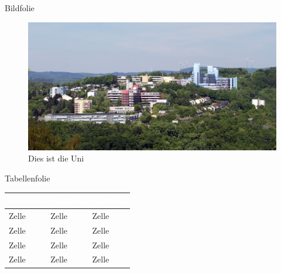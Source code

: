 \documentclass[aspectratio=169, table]{beamer}
\begin{document}
\begin{frame}{Bildfolie}
	\begin{figure}
		\includegraphics[height=.5\textheight]{img/progress.jpg}
		\caption{Dies ist die Uni}
	\end{figure}
\end{frame}

\newcommand{\thead}[1]{\cellcolor{test}\textcolor{white}{#1}}

\begin{frame}{Tabellenfolie}
	\begin{table}
		\begin{tabularx}{10cm}{X | X | X}
			
			\thead{Spalte 1} & \thead{Spalte 2} & \thead{Spalte 3}\\\hline\hline
			Zelle & Zelle& Zelle\\
			Zelle & Zelle& Zelle\\
			Zelle & Zelle& Zelle\\
			Zelle & Zelle& Zelle\\
		\end{tabularx}
	\end{table}\end{frame}

\begin{frame}
\end{frame}
\end{document}
